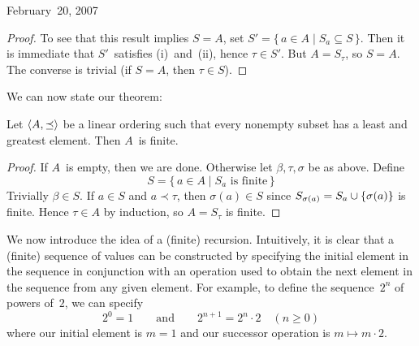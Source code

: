 \begin{lecture}{February~20, 2007}
\begin{proof}
To see that this result implies \(S=A\), set \(S'=\{\,a\in A\mid S_a\subseteq S\,\}\). Then it is immediate that \(S'\)~satisfies (i)~and~(ii), hence \(\tau\in S'\). But \(A=S_{\tau}\), so \(S=A\). The converse is trivial (if \(S=A\), then \(\tau\in S\)).
\end{proof}
\noindent We can now state our theorem:
\begin{thm}
Let \(\langle{A},{\preceq}\rangle\) be a linear ordering such that every nonempty subset has a least and greatest element. Then \(A\)~is finite.
\begin{proof}
If \(A\)~is empty, then we are done. Otherwise let \(\beta,\tau,\sigma\) be as above. Define
\[S=\{\,a\in A\mid S_a\text{ is finite}\,\}\]
Trivially \(\beta\in S\). If \(a\in S\) and \(a\prec\tau\), then \(\sigma(a)\in S\) since \(S_{\sigma(a)}=S_a\cup\{\sigma(a)\}\) is finite. Hence \(\tau\in A\) by induction, so \(A=S_{\tau}\) is finite.
\end{proof}
\end{thm}

We now introduce the idea of a (finite) recursion. Intuitively, it is clear that a (finite) sequence of values can be constructed by specifying the initial element in the sequence in conjunction with an operation used to obtain the next element in the sequence from any given element. For example, to define the sequence~\(2^n\) of powers of~\(2\), we can specify
\[2^0=1\qquad\text{and}\qquad 2^{n+1}=2^n\cdot 2\quad(n\ge0)\]
where our initial element is \(m=1\) and our successor operation is \(m\mapsto m\cdot2\).


\end{lecture}
